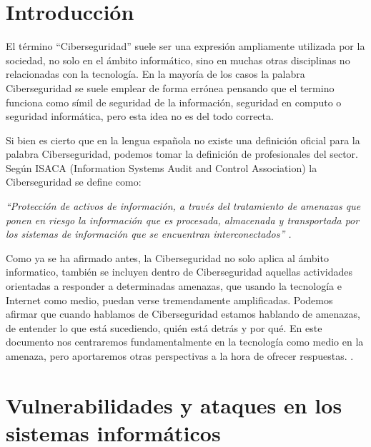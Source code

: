 \chapter{Introducción}
\label{cha:introduccion}

El término “Ciberseguridad” suele ser una expresión ampliamente utilizada por la sociedad, no solo en el ámbito 
informático, sino en muchas otras disciplinas no relacionadas con la tecnología. En la mayoría de los casos la palabra 
Ciberseguridad se suele emplear de forma errónea pensando que el termino funciona como símil de seguridad de la 
información, seguridad en computo o seguridad informática, pero esta idea no es del todo correcta.

Si bien es cierto que en la lengua española no existe una definición oficial para la palabra Ciberseguridad, podemos 
tomar la definición de profesionales del sector. Según ISACA (Information Systems Audit and Control Association) la 
Ciberseguridad se define como:

\emph{“Protección de activos de información, a través del tratamiento de amenazas que ponen en riesgo la información 
que es procesada, almacenada y transportada por los sistemas de información que se encuentran interconectados” \cite{bsecure}.}

Como ya se ha afirmado antes, la Ciberseguridad no solo aplica al ámbito informatico, también se incluyen dentro de Ciberseguridad 
aquellas actividades orientadas a responder a determinadas amenazas, que usando la tecnología e Internet como medio, puedan 
verse tremendamente amplificadas. Podemos afirmar que cuando hablamos de Ciberseguridad estamos hablando de amenazas, 
de entender lo que está sucediendo, quién está detrás y por qué. En este documento nos centraremos fundamentalmente en la 
tecnología como medio en la amenaza, pero aportaremos otras perspectivas a la hora de ofrecer respuestas. \nocite{pwc}.




\chapter{Vulnerabilidades y ataques en los sistemas informáticos}
\label{cha:vulneravilidades-y-ataques}


